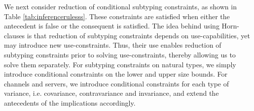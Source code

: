 We next consider reduction of conditional subtyping constraints, as shown in Table \ref{tab:inferencerulesss}. These constraints are satisfied when either the antecedent is false or the consequent is satisfied. The idea behind using Horn-clauses is that reduction of subtyping constraints depends on use-capabilities, yet may introduce new use-constraints. Thus, their use enables reduction of subtyping constraints prior to solving use-constraints, thereby allowing us to solve them separately. For subtyping constraints on natural types, we simply introduce conditional constraints on the lower and upper size bounds. For channels and servers, we introduce conditional constraints for each type of variance, i.e. covariance, contravariance and invariance, and extend the antecedents of the implications accordingly.\\

